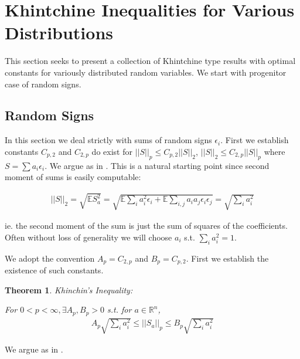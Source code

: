 \documentclass[10pt]{article}
\newcommand{\E}{\mathbb{E}}
\newcommand{\1}{\textbf{1}}
\newcommand{\R}{\mathbb{R}}
\newcommand{\norm}[1]{||#1||}
\newtheorem{theorem}{Theorem}
\theoremstyle{remark}
\theoremstyle{definition}
\begin{document}
\section{Khintchine Inequalities for Various Distributions}

This section seeks to present a collection of Khintchine type results with optimal constants for variously distributed random variables. We start with progenitor case of random signs.

\subsection{Random Signs}

In this section we deal strictly with sums of random signs $\epsilon_i$. First we establish constants $C_{p,2}$ and $C_{2,p}$ do exist for $||S||_p \leq C_{p,2} ||S||_2$, $ ||S||_2 \leq C_{2,p}||S||_p$ where $S = \sum a_i \epsilon_i$. We argue as in \cite{LT}. This is a natural starting point since second moment of sums is easily computable:

\begin{align*}
	\norm{S}_2 = \sqrt{\E S_a^2} = \sqrt{\E\sum_i a_i^2 \epsilon_i + \E\sum_{i,j}a_ia_j \epsilon_i\epsilon_j} = \sqrt{\sum_i a_i^2}
\end{align*}

ie. the second moment of the sum is just the sum of squares of the coefficients. Often without loss of generality we will choose $a_i$ s.t. $\sum_i a_i^2 = 1$.  

We adopt the convention $A_p = C_{2,p}$ and $B_p = C_{p,2}$. First we establish the existence of such constants. 

\begin{theorem}Khinchin's Inequality:
	
	For $0 < p < \infty, \exists A_p,B_p > 0$ s.t. for $a \in \R^n$,
	\begin{align*}
		A_p\sqrt{\sum_i a_i^2} \leq \norm{S_a}_p \leq B_p \sqrt{\sum_i a_i^2}
	\end{align*}
\end{theorem}

We argue as in \cite{LT}.
\end{document}
